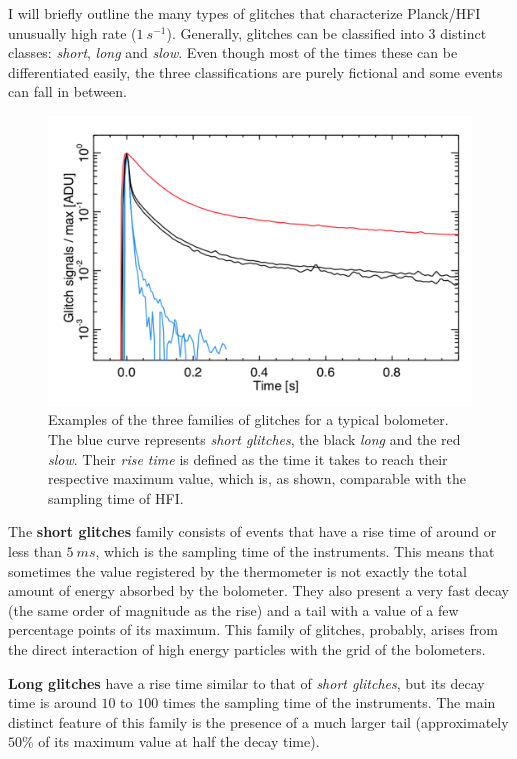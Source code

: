 \documentclass[12pt,a4paper,final]{book}			%
\begin{document}
									I will briefly outline the many types of glitches that characterize Planck/HFI unusually high rate ($1~\unit{s^{-1}}$).
						 Generally, glitches can be classified into 3 distinct classes: \textit{short}, \textit{long} and \textit{slow}. Even though most of the times these can be differentiated easily, the three classifications are purely fictional and some events can fall in between.			
				\begin{figure}[h!]
					\centering
					\includegraphics[scale=0.5]{figures/plagio_glitches.png}
					\caption{Examples of the three families of glitches for a typical bolometer. The blue curve represents \textit{short glitches}, the black \textit{long} and the red \textit{slow}. Their \textit{rise time} is defined as the time it takes to reach their respective maximum value, which is, as shown, comparable with the sampling time of HFI. \cite{planck_glitches}}
					\label{plagio_glitches}
				\end{figure}
				
				The \textbf{short glitches} family consists of events that have a rise time of around or less than $5~\unit{ms}$, which is the sampling time of the instruments. This means that sometimes the value registered by the thermometer is not exactly the total amount of energy absorbed by the bolometer. They also present a very fast decay (the same order of magnitude as the rise) and a tail with a value of a few percentage points of its maximum. This family of glitches, probably, arises from the direct interaction of high energy particles with the grid of the bolometers. 		\cite{glitch_impact_planck}			
				
				\textbf{Long glitches} have a rise time similar to that of \textit{short glitches}, but its decay time is around $10$ to $100$ times the sampling time of the instruments. The main distinct feature of this family is the presence of a much larger tail (approximately $50\%$ of its maximum value at half the decay time).
				
\end{document}
